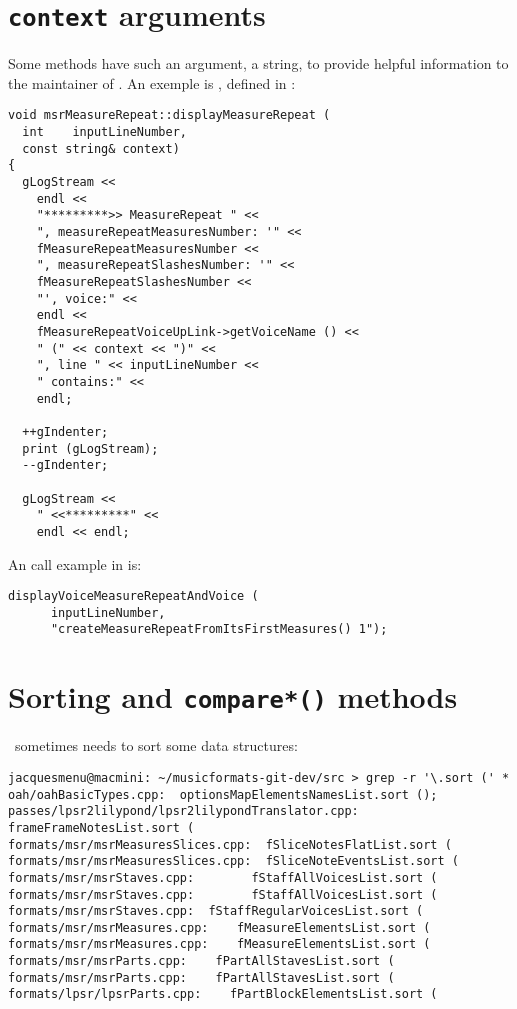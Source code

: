 \section{{\tt context} arguments}

Some methods have such an argument, a string, to provide helpful information to the maintainer of \mf. An exemple is , defined in :
\begin{lstlisting}[language=CPlusPlus]
void msrMeasureRepeat::displayMeasureRepeat (
  int    inputLineNumber,
  const string& context)
{
  gLogStream <<
    endl <<
    "*********>> MeasureRepeat " <<
    ", measureRepeatMeasuresNumber: '" <<
    fMeasureRepeatMeasuresNumber <<
    ", measureRepeatSlashesNumber: '" <<
    fMeasureRepeatSlashesNumber <<
    "', voice:" <<
    endl <<
    fMeasureRepeatVoiceUpLink->getVoiceName () <<
    " (" << context << ")" <<
    ", line " << inputLineNumber <<
    " contains:" <<
    endl;

  ++gIndenter;
  print (gLogStream);
  --gIndenter;

  gLogStream <<
    " <<*********" <<
    endl << endl;
\end{lstlisting}

An call example in  is:
\begin{lstlisting}[language=CPlusPlus]
    displayVoiceMeasureRepeatAndVoice (
      inputLineNumber,
      "createMeasureRepeatFromItsFirstMeasures() 1");
\end{lstlisting}


\section{Sorting and {\tt compare*()} methods}

\mf\ sometimes needs to sort some data structures:
\begin{lstlisting}[language=Terminal]
jacquesmenu@macmini: ~/musicformats-git-dev/src > grep -r '\.sort (' *
oah/oahBasicTypes.cpp:  optionsMapElementsNamesList.sort ();
passes/lpsr2lilypond/lpsr2lilypondTranslator.cpp:    frameFrameNotesList.sort (
formats/msr/msrMeasuresSlices.cpp:  fSliceNotesFlatList.sort (
formats/msr/msrMeasuresSlices.cpp:  fSliceNoteEventsList.sort (
formats/msr/msrStaves.cpp:        fStaffAllVoicesList.sort (
formats/msr/msrStaves.cpp:        fStaffAllVoicesList.sort (
formats/msr/msrStaves.cpp:  fStaffRegularVoicesList.sort (
formats/msr/msrMeasures.cpp:    fMeasureElementsList.sort (
formats/msr/msrMeasures.cpp:    fMeasureElementsList.sort (
formats/msr/msrParts.cpp:    fPartAllStavesList.sort (
formats/msr/msrParts.cpp:    fPartAllStavesList.sort (
formats/lpsr/lpsrParts.cpp:    fPartBlockElementsList.sort (
\end{lstlisting}

